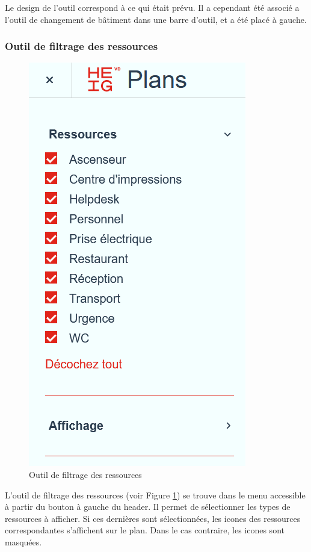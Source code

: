 \documentclass[
    iai, %
    il, %
]{heig-tb}
\begin{document}
Le design de l'outil correspond à ce qui était prévu. Il a cependant été associé a l'outil de changement de bâtiment dans une barre d'outil,
et a été placé à gauche.

\subsubsection{Outil de filtrage des ressources}

\begin{figure}[h]
    \centering
    \includegraphics[scale=0.5]{frontend-filtresRessources.png}
    \caption{Outil de filtrage des ressources}
    \label{fig:ressources-filtre}
\end{figure}

L'outil de filtrage des ressources (voir Figure \ref{fig:ressources-filtre}) se trouve dans le menu accessible à partir du bouton à gauche du header.
Il permet de sélectionner les types de ressources à afficher.
Si ces dernières sont sélectionnées, les icones des ressources correspondantes s'affichent sur le plan.
Dans le cas contraire, les icones sont masquées.
\end{document}
